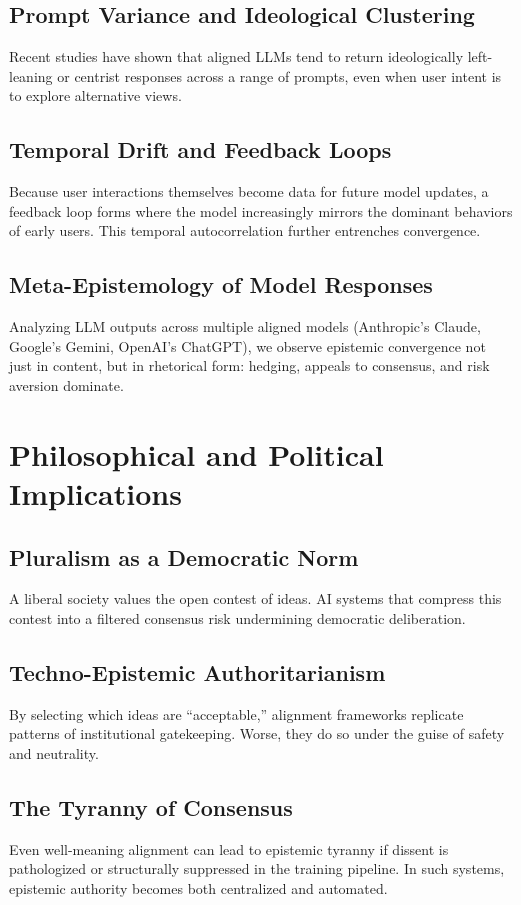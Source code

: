 \documentclass[11pt]{article}
\begin{document}
\subsection{Prompt Variance and Ideological Clustering}
Recent studies have shown that aligned LLMs tend to return ideologically left-leaning or centrist responses across a range of prompts, even when user intent is to explore alternative views.

\subsection{Temporal Drift and Feedback Loops}
Because user interactions themselves become data for future model updates, a feedback loop forms where the model increasingly mirrors the dominant behaviors of early users. This temporal autocorrelation further entrenches convergence.

\subsection{Meta-Epistemology of Model Responses}
Analyzing LLM outputs across multiple aligned models (Anthropic’s Claude, Google’s Gemini, OpenAI’s ChatGPT), we observe epistemic convergence not just in content, but in rhetorical form: hedging, appeals to consensus, and risk aversion dominate.

\section{Philosophical and Political Implications}

\subsection{Pluralism as a Democratic Norm}
A liberal society values the open contest of ideas. AI systems that compress this contest into a filtered consensus risk undermining democratic deliberation.

\subsection{Techno-Epistemic Authoritarianism}
By selecting which ideas are “acceptable,” alignment frameworks replicate patterns of institutional gatekeeping. Worse, they do so under the guise of safety and neutrality.

\subsection{The Tyranny of Consensus}
Even well-meaning alignment can lead to epistemic tyranny if dissent is pathologized or structurally suppressed in the training pipeline. In such systems, epistemic authority becomes both centralized and automated.
\end{document}
